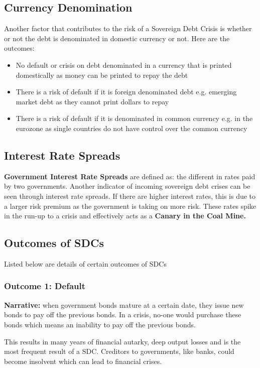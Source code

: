 \documentclass[12pt, letterpaper]{article}
\begin{document}
\subsection{Currency Denomination}
Another factor that contributes to the risk of a Sovereign Debt Crisis is whether or not the debt is denominated in domestic currency or not. Here are the outcomes:
\begin{itemize}
	\item No default or crisis on debt denominated in a currency that is printed domestically as money can be printed to repay the debt
	\item There is a risk of default if it is foreign denominated debt e.g. emerging market debt as they cannot print dollars to repay
	\item There is a risk of default if it is denominated in common currency e.g. in the eurozone as single countries do not have control over the common currency
\end{itemize}

\subsection{Interest Rate Spreads}
\textbf{Government Interest Rate Spreads} are defined as: the different in rates paid by two governments. Another indicator of incoming sovereign debt crises can be seen through interest rate spreads. If there are higher interest rates, this is due to a larger risk premium as the government is taking on more risk. These rates spike in the run-up to a crisis and effectively acts as a \textbf{Canary in the Coal Mine.}

\subsection{Outcomes of SDCs}
Listed below are details of certain outcomes of SDCs
\subsubsection{Outcome 1: Default}
\textbf{Narrative:} when government bonds mature at a certain date, they issue new bonds to pay off the previous bonds. In a crisis, no-one would purchase these bonds which means an inability to pay off the previous bonds.

This results in many years of financial autarky, deep output losses and is the most frequent result of a SDC. Creditors to governments, like banks, could become insolvent which can lead to financial crises. 
\end{document}
